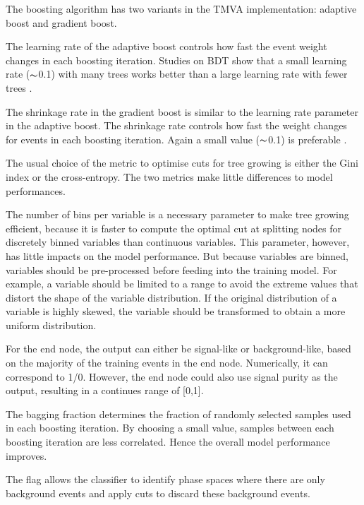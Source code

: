The boosting algorithm has two variants in the TMVA implementation: adaptive boost and gradient boost.

The learning rate of the adaptive boost  controls how fast the event weight changes in each boosting iteration. Studies on BDT show that a small learning rate ($\thicksim$0.1) with many trees works better than a large learning rate with fewer trees \cite{hastie2009elements}.

The shrinkage rate in the gradient boost is similar to the learning rate parameter in the adaptive boost. The shrinkage rate controls how fast the weight changes for events in each boosting iteration. Again a small value   ($\thicksim$0.1) is preferable \cite{hastie2009elements}.

The usual choice of the metric to optimise cuts for tree growing is either the Gini index or the cross-entropy. The two metrics make  little differences to model performances.



The number of bins per variable is  a necessary parameter to make tree growing efficient, because it is faster to compute the optimal cut at splitting nodes for discretely binned variables than continuous variables. This parameter, however,  has little  impacts on the model performance. But because variables are binned, variables should be pre-processed before feeding into the training model. For example, a variable should be limited to a range to avoid the extreme values that distort the shape of the variable distribution. If the original distribution of a variable is highly skewed, the variable should be transformed to obtain a more uniform distribution.

For the end node, the output can either be  signal-like or background-like, based on the majority of the training events in the end node. Numerically, it can correspond to 1/0. However, the end node could also use signal purity as the output, resulting in a continues range of [0,1].

The bagging fraction determines the fraction of randomly selected samples used in each boosting iteration. By choosing a small value, samples between each boosting iteration are less correlated. Hence the overall model performance improves.

The \DoPreSelection flag allows the classifier to identify  phase spaces where there are only background events and apply cuts to discard these background events.

